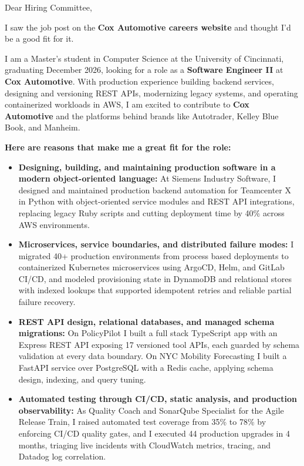 \documentclass[11pt]{letter}
\date{}
\begin{document}
\begin{letter}{}

\opening{Dear Hiring Committee,}

I saw the job post on the \textbf{Cox Automotive careers website} and thought I'd be a good fit for it.

I am a Master's student in Computer Science at the University of Cincinnati, graduating December 2026, looking for a role as a \textbf{Software Engineer II} at \textbf{Cox Automotive}. With production experience building backend services, designing and versioning REST APIs, modernizing legacy systems, and operating containerized workloads in AWS, I am excited to contribute to \textbf{Cox Automotive} and the platforms behind brands like Autotrader, Kelley Blue Book, and Manheim.

\textbf{Here are reasons that make me a great fit for the role:}

\begin{itemize}[leftmargin=*, itemsep=0.45em]
    \item \textbf{Designing, building, and maintaining production software in a modern object-oriented language:} At Siemens Industry Software, I designed and maintained production backend automation for Teamcenter X in Python with object-oriented service modules and REST API integrations, replacing legacy Ruby scripts and cutting deployment time by 40\% across AWS environments.

    \item \textbf{Microservices, service boundaries, and distributed failure modes:} I migrated 40+ production environments from process based deployments to containerized Kubernetes microservices using ArgoCD, Helm, and GitLab CI/CD, and modeled provisioning state in DynamoDB and relational stores with indexed lookups that supported idempotent retries and reliable partial failure recovery.

    \item \textbf{REST API design, relational databases, and managed schema migrations:} On PolicyPilot I built a full stack TypeScript app with an Express REST API exposing 17 versioned tool APIs, each guarded by schema validation at every data boundary. On NYC Mobility Forecasting I built a FastAPI service over PostgreSQL with a Redis cache, applying schema design, indexing, and query tuning.

    \item \textbf{Automated testing through CI/CD, static analysis, and production observability:} As Quality Coach and SonarQube Specialist for the Agile Release Train, I raised automated test coverage from 35\% to 78\% by enforcing CI/CD quality gates, and I executed 44 production upgrades in 4 months, triaging live incidents with CloudWatch metrics, tracing, and Datadog log correlation.


\end{itemize}
\end{letter}
\end{document}

